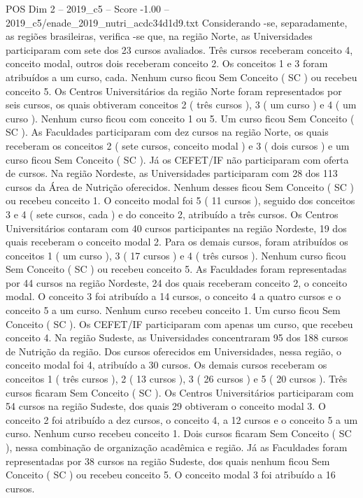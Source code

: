 \begin{textsample}{POS Dim 2 – 2019\_c5 – Score -1.00 – 2019\_c5/enade\_2019\_nutri\_acdc34d1d9.txt}
Considerando -se, separadamente, as regiões brasileiras, verifica -se que, na região Norte, as Universidades participaram com sete dos 23 cursos avaliados.
Três cursos receberam conceito 4, conceito modal, outros dois receberam conceito 2.
Os conceitos 1 e 3 foram atribuídos a um curso, cada.
Nenhum curso ficou Sem Conceito ( SC ) ou recebeu conceito 5.
Os Centros Universitários da região Norte foram representados por seis cursos, os quais obtiveram conceitos 2 ( três cursos ), 3 ( um curso ) e 4 ( um curso ).
Nenhum curso ficou com conceito 1 ou 5.
Um curso ficou Sem Conceito ( SC ).
As Faculdades participaram com dez cursos na região Norte, os quais receberam os conceitos 2 ( sete cursos, conceito modal ) e 3 ( dois cursos ) e um curso ficou Sem Conceito ( SC ).
Já os CEFET/IF não participaram com oferta de cursos.
Na região Nordeste, as Universidades participaram com 28 dos 113 cursos da Área de Nutrição oferecidos.
Nenhum desses ficou Sem Conceito ( SC ) ou recebeu conceito 1.
O conceito modal foi 5 ( 11 cursos ), seguido dos conceitos 3 e 4 ( sete cursos, cada ) e do conceito 2, atribuído a três cursos.
Os Centros Universitários contaram com 40 cursos participantes na região Nordeste, 19 dos quais receberam o conceito modal 2.
Para os demais cursos, foram atribuídos os conceitos 1 ( um curso ), 3 ( 17 cursos ) e 4 ( três cursos ).
Nenhum curso ficou Sem Conceito ( SC ) ou recebeu conceito 5.
As Faculdades foram representadas por 44 cursos na região Nordeste, 24 dos quais receberam conceito 2, o conceito modal.
O conceito 3 foi atribuído a 14 cursos, o conceito 4 a quatro cursos e o conceito 5 a um curso.
Nenhum curso recebeu conceito 1.
Um curso ficou Sem Conceito ( SC ).
Os CEFET/IF participaram com apenas um curso, que recebeu conceito 4.
Na região Sudeste, as Universidades concentraram 95 dos 188 cursos de Nutrição da região.
Dos cursos oferecidos em Universidades, nessa região, o conceito modal foi 4, atribuído a 30 cursos.
Os demais cursos receberam os conceitos 1 ( três cursos ), 2 ( 13 cursos ), 3 ( 26 cursos ) e 5 ( 20 cursos ).
Três cursos ficaram Sem Conceito ( SC ).
Os Centros Universitários participaram com 54 cursos na região Sudeste, dos quais 29 obtiveram o conceito modal 3.
O conceito 2 foi atribuído a dez cursos, o conceito 4, a 12 cursos e o conceito 5 a um curso.
Nenhum curso recebeu conceito 1.
Dois cursos ficaram Sem Conceito ( SC ), nessa combinação de organização acadêmica e região.
Já as Faculdades foram representadas por 38 cursos na região Sudeste, dos quais nenhum ficou Sem Conceito ( SC ) ou recebeu conceito 5.
O conceito modal 3 foi atribuído a 16 cursos.

\end{textsample}
